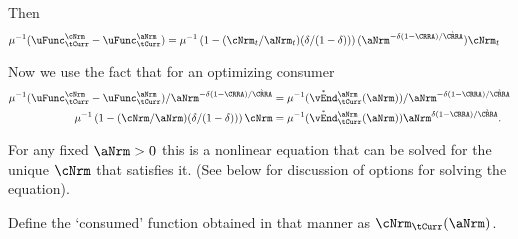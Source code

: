 \documentclass[./SolvingMicroDSOPs]{subfiles}
\begin{document}
  Then
  \begin{align}
    \muInv(\uFunc^{\cNrm}_{\tCurr}-\uFunc^{\aNrm}_{\tCurr}) & = \muInv\left(1-(\cNrm_{t}/\aNrm_{t})(\wealthU/(1-\wealthU))\right)(\aNrm^{-\wealthU(1-\CRRA)/\grave{\CRRA}})\cNrm_{t}
  \end{align}
  
  Now we use the fact that for an optimizing consumer
  \begin{align}
    \muInv(\uFunc^{\cNrm}_{\tCurr}-\uFunc^{\aNrm}_{\tCurr})/\aNrm^{-\wealthU(1-\CRRA)/\grave{\CRRA}} & = \muInv(\Maxed{\vEnd}_{\tCurr}^{\aNrm}(\aNrm))/\aNrm^{-\wealthU(1-\CRRA)/\grave{\CRRA}}
    \\ \muInv\left(1-(\cNrm/\aNrm)(\wealthU/(1-\wealthU))\right)\cNrm & = \muInv(\Maxed{\vEnd}_{\tCurr}^{\aNrm}(\aNrm)) \aNrm^{\wealthU(1-\CRRA)/\grave{\CRRA}} \notag.
  \end{align}
  
  For any fixed $\aNrm>0$ this is a nonlinear equation that can be solved for the unique $\cNrm$ that satisfies it.  (See below for discussion of options for solving the equation).
  
  Define the `consumed' function obtained in that manner as $\mathfrak{\cNrm}_{\tCurr}(\aNrm)$.
  
\end{document}
